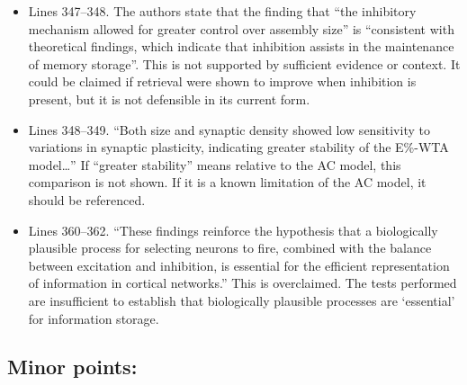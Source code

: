 \documentclass[a4paper, 11pt]{article}
\begin{document}
\begin{itemize}
\begin{itemize}
        \item Lines 347--348. The authors state that the finding that ``the inhibitory mechanism allowed for greater control over assembly size'' is ``consistent with theoretical findings, which indicate that inhibition assists in the maintenance of memory storage''. This is not supported by sufficient evidence or context. It could be claimed if retrieval were shown to improve when inhibition is present, but it is not defensible in its current form.
        \item Lines 348--349. ``Both size and synaptic density showed low sensitivity to variations in synaptic plasticity, indicating greater stability of the E\%-WTA model\dots'' If ``greater stability'' means relative to the AC model, this comparison is not shown. If it is a known limitation of the AC model, it should be referenced.
        \item Lines 360--362. ``These findings reinforce the hypothesis that a biologically plausible process for selecting neurons to fire, combined with the balance between excitation and inhibition, is essential for the efficient representation of information in cortical networks.'' This is overclaimed. The tests performed are insufficient to establish that biologically plausible processes are `essential' for information storage.
    \end{itemize}
\end{itemize}

\subsection*{Minor points:}
\end{document}
